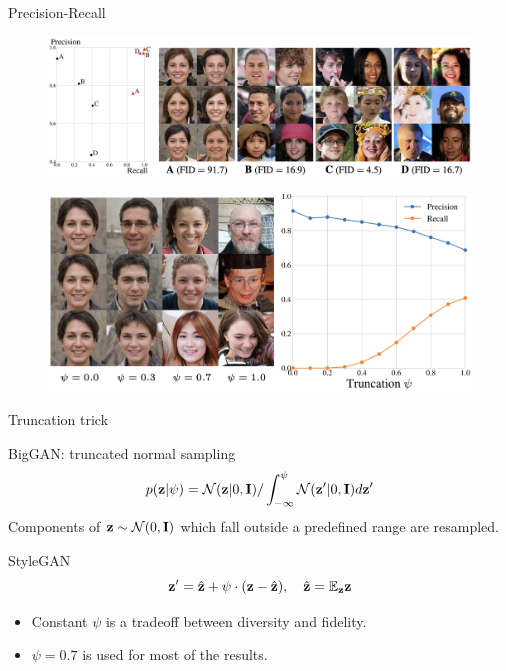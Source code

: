\begin{frame}{Precision-Recall}
	\begin{figure}
		\includegraphics[width=\linewidth]{figs/pr_vs_fid}
	\end{figure}
	\begin{figure}
		\includegraphics[width=0.75\linewidth]{figs/pr_truncation}
	\end{figure}
\end{frame}
\begin{frame}{Truncation trick}
	\begin{block}{BigGAN: truncated normal sampling}
		\vspace{-0.3cm}
		\[
			p(\mathbf{z} | \psi) = \mathcal{N}(\mathbf{z} | 0, \mathbf{I}) / \int_{-\infty}^\psi \mathcal{N}(\mathbf{z}' | 0, \mathbf{I}) d\mathbf{z}'
		\]
		Components of $\mathbf{z} \sim \mathcal{N}(0, \mathbf{I})$ which fall outside a predefined range are resampled.
	\end{block}
	
	\begin{block}{StyleGAN}
		\vspace{-0.2cm}
		\[
			\mathbf{z}' = \hat{\mathbf{z}} + \psi \cdot (\mathbf{z} - \hat{\mathbf{z}}), \quad \hat{\mathbf{z}} = \mathbb{E}_{\mathbf{z}} \mathbf{z}
		\]
		\vspace{-0.2cm}
		\begin{itemize}
			\item Constant $\psi$ is a tradeoff between diversity and fidelity. 
			\item $\psi=0.7$ is used for most of the results.
		\end{itemize}
	\end{block}

\end{frame}
